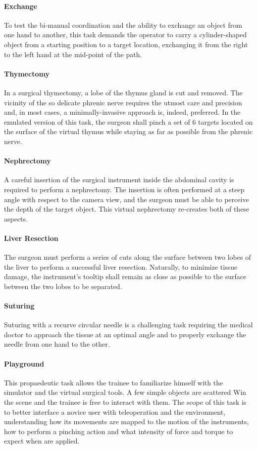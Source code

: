 \documentclass[../main.tex]{subfiles}
\begin{document}
\paragraph{Exchange} To test the bi-manual coordination and the ability to exchange an object from one hand to another, this task demands the operator to carry a cylinder-shaped object from a starting position to a target location, exchanging it from the right to the left hand at the mid-point of the path. 
\paragraph{Thymectomy} In a surgical thymectomy, a lobe of the thymus gland is cut and removed. The vicinity of the so delicate phrenic nerve requires the utmost care and precision and, in most cases, a minimally-invasive approach is, indeed, preferred. In the emulated version of this task, the surgeon shall pinch a set of 6 targets located on the surface of the virtual thymus while staying as far as possible from the phrenic nerve. 
\paragraph{Nephrectomy} A careful insertion of the surgical instrument inside the abdominal cavity is required to perform a nephrectomy. The insertion is often performed at a steep angle with respect to the camera view, and the surgeon must be able to perceive the depth of the target object. This virtual nephrectomy re-creates both of these aspects.
\paragraph{Liver Resection} The surgeon must perform a series of cuts along the surface between two lobes of the liver to perform a successful liver resection. Naturally, to minimize tissue damage, the instrument's tooltip shall remain as close as possible to the surface between the two lobes to be separated.
\paragraph{Suturing} Suturing with a recurve circular needle is a challenging task requiring the medical doctor to approach the tissue at an optimal angle and to properly exchange the needle from one hand to the other.  
\paragraph{Playground} This propaedeutic task allows the trainee to familiarize himself with the simulator and the virtual surgical tools. A few simple objects are scattered Win the scene and the trainee is free to interact with them. The scope of this task is to better interface a novice user with teleoperation and the \vr environment, understanding how its movements are mapped to the motion of the instruments, how to perform a pinching action and what intensity of force and torque to expect when \vfs are applied. 
\end{document}
